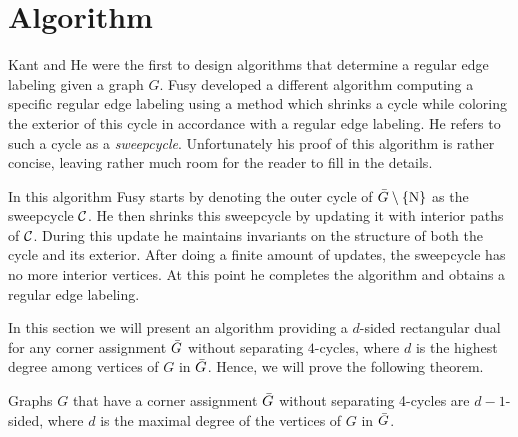 
\section{Algorithm}
\thispagestyle{plain}
\label{s:algo}

  Kant and He \cite{Kant1997} were the first to design algorithms that determine a regular edge labeling given a graph $G$. Fusy \cite{Fusy2006} developed a different algorithm computing a specific regular edge labeling using a method which shrinks a cycle while coloring the exterior of this cycle in accordance with a regular edge labeling.
  He refers to such a cycle as a \emph{sweepcycle}.
  Unfortunately his proof of this algorithm is rather concise, leaving rather much room for the reader to fill in the details.

  In this algorithm Fusy starts by denoting the outer cycle of $\bar{G} \setminus \left\lbrace {\mathrm{N}} \right\rbrace$ as the sweepcycle $\mathcal{C}$. He then shrinks this sweepcycle by updating it with interior paths of $\mathcal{C}$. During this update he maintains invariants on the structure of both the cycle and its exterior.
  After doing a finite amount of updates, the sweepcycle has no more interior vertices. At this point he completes the algorithm and obtains a regular edge labeling.

  In this section we will present an algorithm providing a $d$-sided rectangular dual for any corner assignment $\bar{G}$ without separating $4$-cycles, where $d$ is the highest degree among vertices of $G$ in $\bar{G}$.  Hence, we will prove the following theorem.

  \begin{thrm}
  \label{th:dsided}
  Graphs $G$ that have a corner assignment $\bar{G}$ without separating 4-cycles are $d-1$-sided, where $d$ is the maximal degree of the vertices of $G$ in $\bar{G}$.
  \end{thrm}

